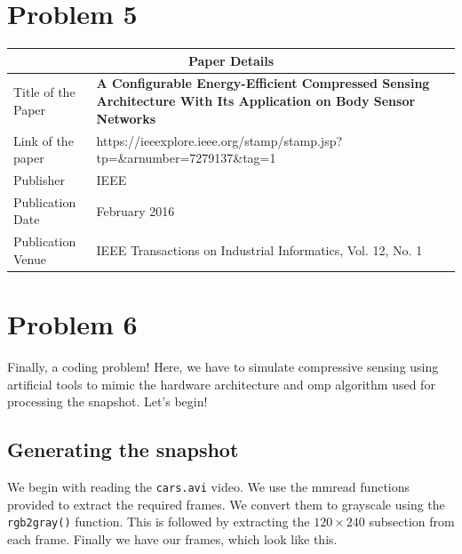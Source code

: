 \documentclass[a4paper,11pt]{article}
\numberwithin{definition}{section}
\numberwithin{mytheorem}{subsection}
\begin{document}
\section{Problem 5}
\begin{center}
    \begin{tabular}{ |p{4cm}||p{12cm}|}
   
    \hline
    \multicolumn{2}{|c|}{Paper Details} \\
    \hline
    Title of the Paper& \textbf{A Configurable Energy-Efficient Compressed
    Sensing Architecture With Its Application
    on Body Sensor Networks}\\
    \hline
    Link of the paper  &  https://ieeexplore.ieee.org/stamp/stamp.jsp?tp=\&arnumber=7279137\&tag=1  \\
    \hline
    Publisher & IEEE \\
    \hline
    Publication Date   &  February 2016 \\
    \hline
    Publication Venue  & IEEE Transactions on Industrial Informatics, Vol. 12, No. 1 \\
    \hline
    
    
   \end{tabular}
\end{center}

\newpage

\section{Problem 6}

Finally, a coding problem! Here, we have to simulate compressive sensing using artificial tools to mimic the hardware architecture and omp algorithm used for processing the snapshot. Let's begin!

\subsection{Generating the snapshot}

We begin with reading the \verb|cars.avi| video. We use the mmread functions provided to extract the required frames.
We convert them to grayscale using the \verb|rgb2gray()| function. This is followed by extracting the $120\times240$ subsection from each frame. Finally we have our frames, which look like this.
\end{document}

